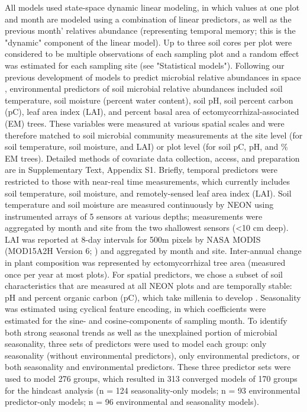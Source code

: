 \documentclass[11pt]{article}
\begin{document}
All models used state-space dynamic linear modeling, in which values at one plot and month are modeled using a combination of linear predictors, as well as the previous month' relatives abundance (representing temporal memory; this is the "dynamic" component of the linear model). Up to  three soil cores per plot were considered to be multiple observations of each sampling plot and a random effect was estimated for each sampling site (see "Statistical models"). Following our previous development of models to predict microbial relative abundances in space \cite{averill_soil_2021}, environmental predictors of soil microbial relative abundances included soil temperature, soil moisture (percent water content), soil pH, soil percent carbon (pC), leaf area index (LAI), and percent basal area of ectomycorrhizal-associated (EM) trees. These variables were measured at various spatial scales and were therefore matched to soil microbial community measurements at the site level (for soil temperature, soil moisture, and LAI) or plot level (for soil pC, pH, and \% EM trees). Detailed methods of covariate data collection, access, and preparation are in Supplementary Text, Appendix S1. Briefly, temporal predictors were restricted to those with near-real time measurements, which currently includes soil temperature, soil moisture, and remotely-sensed leaf area index (LAI). Soil temperature and soil moisture are measured continuously by NEON using instrumented arrays of 5 sensors at various depths; measurements were aggregated by month and site from the two shallowest sensors (<10 cm deep). LAI was reported at 8-day intervals for 500m pixels by NASA MODIS (MOD15A2H Version 6; \cite{myneni_r_knyazikhin_y_park_mod15a2h_2015}) and aggregated by month and site. Inter-annual change in plant composition was represented by ectomycorrhizal tree area (measured once per year at most plots). For spatial predictors, we chose a subset of soil characteristics that are measured at all NEON plots and are temporally stable: pH and percent organic carbon (pC), which take millenia to develop \cite{turner_soil_2015,Walker2010}. Seasonality was estimated using cyclical feature encoding, in which coefficients were estimated for the sine- and cosine-components of sampling month. To identify both strong seasonal trends as well as the unexplained portion of microbial seasonality, three sets of predictors were used to model each group: only seasonality (without environmental predictors), only environmental predictors, or both seasonality and environmental predictors. These three predictor sets were used to model 276 groups, which resulted in 313 converged models of 170 groups for the hindcast analysis (n = 124 seasonality-only models; n = 93 environmental predictor-only models; n = 96 environmental and seasonality models).
\end{document}
